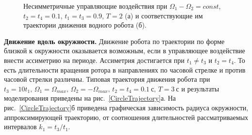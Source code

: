 \begin{figure}[!ht]
	\begin{minipage}[h]{0.5\linewidth}
	\end{minipage}
	\hfill
	\begin{minipage}[h]{0.5\linewidth}
	\end{minipage}
	\vfill
	\begin{minipage}[h]{0.5\linewidth}
	\end{minipage}
	\hfill
	\begin{minipage}[h]{0.5\linewidth}
	\end{minipage}

	\caption{Несимметричные управляющие воздействия при $\Omega_1 - \Omega_2 = const$, $t_2 = t_4 = 0.1$, $t_1 = t_3 = 0.9$, $T = 2$ (а) и соответствующие им траектории движения водного робота (б).}
	\label{DifferentAmp}
\end{figure}

%	
%	

\textbf{Движение вдоль окружности.} Движение робота по траектории по форме близкой к окружности оказывается возможным, если в управляющее воздействие внести ассиметрию на периоде. Ассиметрия достигается при $t_1 \neq t_3$ и $t_2 = t_4$. То есть длительности вращения ротора в направлениях по часовой стрелке и против часовой стрелки различны. Типовая траектория движения робота при $ t_3 = 10 t_1,\, \Omega_1 = \Omega_{max},\, \Omega_2 = -\Omega_{max},\, t_2 = t_4 = 0.1~\text{с},\, T = 3~\text{с} $
и результаты моделирования приведены на рис.~\ref{CircleTrajectory}а. На рис.~\ref{CircleTrajectory}б приведена графическая зависимость радиуса окружности, аппроксимирующей траекторию, от соотношения длительностей рассматриваемых интервалов $k_1 = t_3 / t_1$. 

